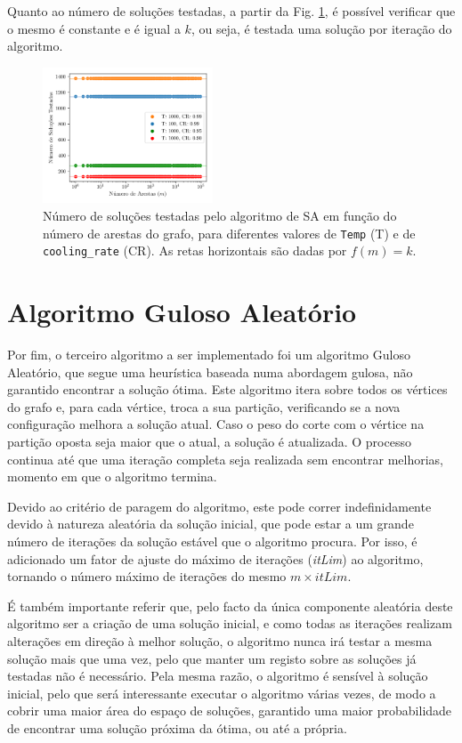 \documentclass[mirror, portugues]{revdetua}
\begin{document}
Quanto ao número de soluções testadas, a partir da Fig. \ref{fig:sols_satested}, é possível verificar que o mesmo é constante e é igual a $k$, ou seja, é testada uma solução por iteração do algoritmo.

\begin{figure}[H]
    \centering
    \includegraphics[width=0.45\textwidth]{../assets/sols_Simulated .png}
    \caption{Número de soluções testadas pelo algoritmo de SA em função do número de arestas do grafo, para diferentes valores de \texttt{Temp} (T) e de \texttt{cooling\_rate} (CR). As retas horizontais são dadas por $f(m) = k$.}
    \label{fig:sols_satested}
\end{figure}

\section{Algoritmo Guloso Aleatório}

Por fim, o terceiro algoritmo a ser implementado foi um algoritmo Guloso Aleatório, que segue uma heurística baseada numa abordagem gulosa, não garantido encontrar a solução ótima. Este algoritmo itera sobre todos os vértices do grafo e, para cada vértice, troca a sua partição, verificando se a nova configuração melhora a solução atual. Caso o peso do corte com o vértice na partição oposta seja maior que o atual, a solução é atualizada. O processo continua até que uma iteração completa seja realizada sem encontrar melhorias, momento em que o algoritmo termina.

Devido ao critério de paragem do algoritmo, este pode correr indefinidamente devido à natureza aleatória da solução inicial, que pode estar a um grande número de iterações da solução estável que o algoritmo procura. Por isso, é adicionado um fator de ajuste do máximo de iterações (\textit{itLim}) ao algoritmo, tornando o número máximo de iterações do mesmo $m \times itLim$.

É também importante referir que, pelo facto da única componente aleatória deste algoritmo ser a criação de uma solução inicial, e como todas as iterações realizam alterações em direção à melhor solução, o algoritmo nunca irá testar a mesma solução mais que uma vez, pelo que manter um registo sobre as soluções já testadas não é necessário. Pela mesma razão, o algoritmo é sensível à solução inicial, pelo que será interessante executar o algoritmo várias vezes, de modo a cobrir uma maior área do espaço de soluções, garantido uma maior probabilidade de encontrar uma solução próxima da ótima, ou até a própria.
\end{document}
